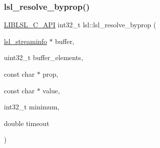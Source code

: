 \subsubsection{\texorpdfstring{lsl\+\_\+resolve\+\_\+byprop()}{lsl\_resolve\_byprop()}}
{\footnotesize\ttfamily \hyperlink{lsl__cpp_8h_aafd0ef1813e8be84a1420c4f1df64615}{L\+I\+B\+L\+S\+L\+\_\+\+C\+\_\+\+A\+PI} int32\+\_\+t lsl\+::lsl\+\_\+resolve\+\_\+byprop (\begin{DoxyParamCaption}\item[{\hyperlink{namespacelsl_aa0a9ce9956061679949daa2e35aae2e8}{lsl\+\_\+streaminfo} $\ast$}]{buffer,  }\item[{uint32\+\_\+t}]{buffer\+\_\+elements,  }\item[{const char $\ast$}]{prop,  }\item[{const char $\ast$}]{value,  }\item[{int32\+\_\+t}]{minimum,  }\item[{double}]{timeout }\end{DoxyParamCaption})}


